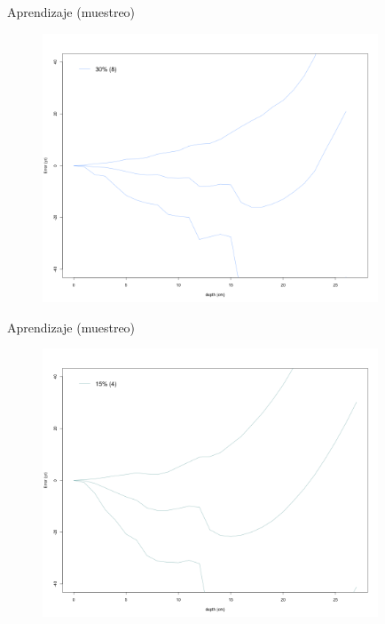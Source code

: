 \documentclass{beamer}
\begin{document}
\begin{frame}{Aprendizaje (muestreo)}
 	\begin{figure}
		\begin{centering}
			\includegraphics[width=10cm]{./Figures/Chrono_ssize_difsd30.png}
			\caption{}
			\label{}
		\end{centering}
	\end{figure}
\end{frame} 


\begin{frame}{Aprendizaje (muestreo)}
 	\begin{figure}
		\begin{centering}
			\includegraphics[width=10cm]{./Figures/Chrono_ssize_difsd10.png}
			\caption{}
			\label{}
		\end{centering}
	\end{figure}
\end{frame} 
\end{document}

